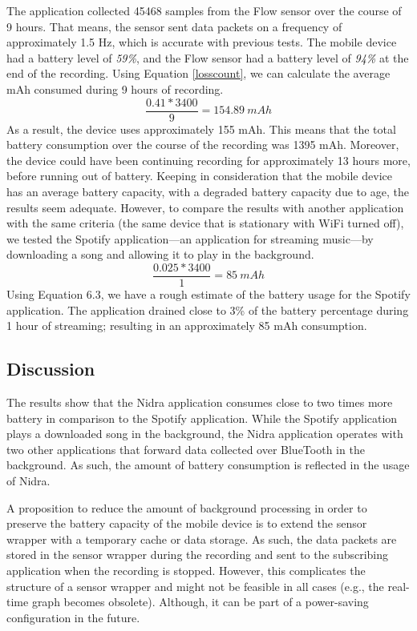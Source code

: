 The application collected 45468 samples from the Flow sensor over the course of 9 hours. That means, the sensor sent data packets on a frequency of approximately 1.5 Hz, which is accurate with previous tests. The mobile device had a battery level of \textit{59\%}, and the Flow sensor had a battery level of \textit{94\%} at the end of the recording. Using Equation \ref{losscount}, we can calculate the average mAh consumed during 9 hours of recording. 
\begin{equation}
\frac{0.41 * 3400}{9} = 154.89\ mAh
\end{equation}
As a result, the device uses approximately 155 mAh. This means that the total battery consumption over the course of the recording was 1395 mAh. Moreover, the device could have been continuing recording for approximately 13 hours more, before running out of battery. Keeping in consideration that the mobile device has an average battery capacity, with a degraded battery capacity due to age, the results seem adequate. However, to compare the results with another application with the same criteria (the same device that is stationary with WiFi turned off), we tested the Spotify application---an application for streaming music---by downloading a song and allowing it to play in the background.
\begin{equation}
\frac{0.025 * 3400}{1} = 85\ mAh
\end{equation}
Using Equation 6.3, we have a rough estimate of the battery usage for the Spotify application. The application drained close to 3\% of the battery percentage during 1 hour of streaming; resulting in an approximately 85 mAh consumption.  

\subsection{Discussion}
The results show that the Nidra application consumes close to two times more battery in comparison to the Spotify application. While the Spotify application plays a downloaded song in the background, the Nidra application operates with two other applications that forward data collected over BlueTooth in the background. As such, the amount of battery consumption is reflected in the usage of Nidra. 

A proposition to reduce the amount of background processing in order to preserve the battery capacity of the mobile device is to extend the sensor wrapper with a temporary cache or data storage. As such, the data packets are stored in the sensor wrapper during the recording and sent to the subscribing application when the recording is stopped. However, this complicates the structure of a sensor wrapper and might not be feasible in all cases (e.g., the real-time graph becomes obsolete). Although, it can be part of a power-saving configuration in the future. 


